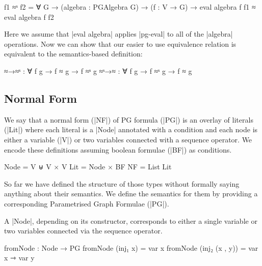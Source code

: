 
\begin{code}
f1 ≈ˢ f2 = 
   ∀ G → (algebra : PGAlgebra G) → (f : V → G) → 
   eval algebra f f1 ≈ eval algebra f f2 
\end{code}

Here we assume that |eval algebra| applies |pg-eval| to all of the |algebra| operations.
Now we can show that our easier to use equivalence relation is equivalent to the semantics-based definition:


\begin{code}
≈→≈ˢ : ∀ f g → f ≈ g → f ≈ˢ g
≈ˢ→≈ : ∀ f g → f ≈ˢ g → f ≈ g
\end{code}

\subsection{Normal Form}


We say that a normal form (|NF|) of PG formula (|PG|) is an overlay of literals (|Lit|) where each literal is a |Node| annotated with a condition and each node is either a variable (|V|) or two variables connected with a sequence operator. We encode these definitions assuming boolean formulae (|BF|) as conditions.

\begin{code}
Node = V ⊎ V × V
Lit = Node × BF
NF = List Lit
\end{code}

So far we have defined the structure of those types without formally saying anything about their semantics. We define the semantics for them by providing a corresponding Parametrised Graph Formulae (|PG|).


A |Node|, depending on its constructor, corresponds to either a single variable or two variables connected via the sequence operator.
\begin{code}
   fromNode : Node → PG
   fromNode (inj₁ x) = var x
   fromNode (inj₂ (x , y)) = var x ⇾ var y
\end{code}

